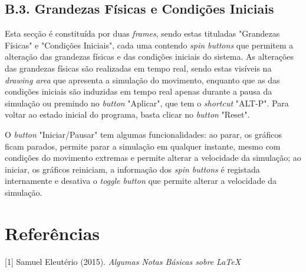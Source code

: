\documentclass[a4paper]{article}
\begin{document}
\subsection{ B.3. Grandezas Físicas e Condições Iniciais}
\par Esta secção é constituída por duas \textit{frames}, sendo estas tituladas "Grandezas Físicas" e "Condições Iniciais", cada uma contendo \textit{spin buttons} que permitem a alteração das grandezas físicas e das condições iniciais do sistema. As alterações das grandezas físicas são realizadas em tempo real, sendo estas visíveis na \textit{drawing area} que apresenta a simulação do movimento, enquanto que as das condições iniciais são induzidas em tempo real apenas durante a pausa da simulação ou premindo no \textit{button} "Aplicar", que tem o \textit{shortcut} "ALT-P". Para voltar ao estado inicial do programa, basta clicar no \textit{button} "Reset".
\par O \textit{button} "Iniciar/Pausar" tem algumas funcionalidades: ao parar, os gráficos ficam parados, permite parar a simulação em qualquer instante, mesmo com condições do movimento extremas e permite alterar a velocidade da simulação; ao iniciar, os gráficos reiniciam, a informação dos \textit{spin buttons} é registada internamente e desativa o \textit{toggle button} que permite alterar a velocidade da simulação.

\section{\bf  Referências}

   [1] Samuel Eleutério (2015). {\em Algumas Notas Básicas sobre \LaTeX}
  
\end{document}

